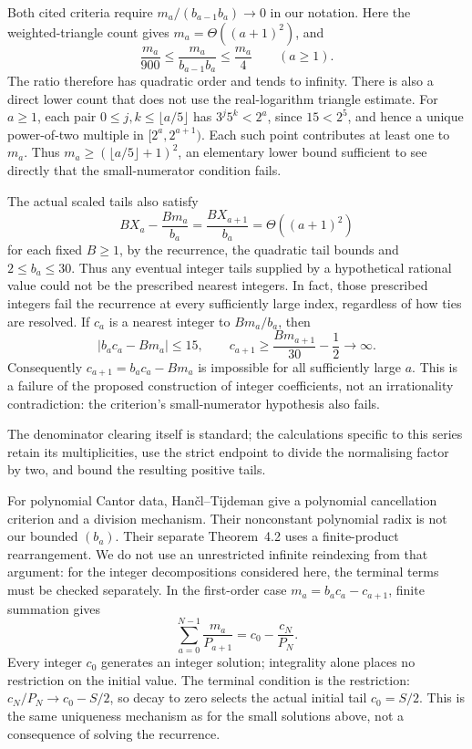 \documentclass[11pt]{article}
\theoremstyle{remark}
\theoremstyle{plain}
\begin{document}
Both cited criteria require $m_a/(b_{a-1}b_a)\to0$ in our notation.
Here the weighted-triangle count gives $m_a=\Theta((a+1)^2)$, and
\[
 \frac{m_a}{900}\le\frac{m_a}{b_{a-1}b_a}\le\frac{m_a}{4}
 \qquad(a\ge1).
\]
The ratio therefore has quadratic order and tends to infinity.
There is also a direct lower count that does not use the real-logarithm
triangle estimate.  For $a\ge1$, each pair
$0\le j,k\le\lfloor a/5\rfloor$ has $3^j5^k<2^a$, since $15<2^5$,
and hence a unique power-of-two multiple in $[2^a,2^{a+1})$.
Each such point contributes at least one to $m_a$.  Thus
$m_a\ge(\lfloor a/5\rfloor+1)^2$, an elementary lower bound sufficient
to see directly that the small-numerator condition fails.

The actual scaled tails also satisfy
\[
 BX_a-\frac{Bm_a}{b_a}=\frac{BX_{a+1}}{b_a}
 =\Theta((a+1)^2)
\]
for each fixed $B\ge1$, by the recurrence, the quadratic tail bounds and
$2\le b_a\le30$.  Thus any eventual integer tails supplied by a
hypothetical rational value could not be the prescribed nearest integers.
In fact, those prescribed integers fail the recurrence at every
sufficiently large index, regardless of how ties are resolved.  If $c_a$
is a nearest integer to $Bm_a/b_a$, then
\[
 |b_ac_a-Bm_a|\le15,\qquad
 c_{a+1}\ge\frac{Bm_{a+1}}{30}-\frac12\longrightarrow\infty.
\]
Consequently $c_{a+1}=b_ac_a-Bm_a$ is impossible for all sufficiently
large $a$.  This is a failure of the proposed construction of integer coefficients, not an irrationality
contradiction: the criterion's small-numerator hypothesis also fails.

The denominator clearing itself is standard; the calculations specific
to this series retain its multiplicities, use the strict endpoint to
divide the normalising factor by two, and bound the resulting positive tails.

For polynomial Cantor data, Han\v{c}l--Tijdeman
\cite[Theorems~2.2 and 3.1]{hancltijdeman2008} give a polynomial
cancellation criterion and a division mechanism.  Their nonconstant
polynomial radix is not our bounded $(b_a)$.  Their separate
Theorem~4.2 uses a finite-product rearrangement.  We do not use an
unrestricted infinite reindexing from that argument: for the integer
decompositions considered here, the terminal terms must be checked
separately.  In the first-order case
$m_a=b_ac_a-c_{a+1}$, finite summation gives
\[
 \sum_{a=0}^{N-1}\frac{m_a}{P_{a+1}}
 =c_0-\frac{c_N}{P_N}.
\]
Every integer $c_0$ generates an integer solution; integrality alone
places no restriction on the initial value. The terminal condition is the
restriction: $c_N/P_N\to c_0-S/2$, so decay to zero selects the actual
initial tail $c_0=S/2$. This is the same uniqueness mechanism as for the
small solutions above, not a consequence of solving the recurrence.
\end{document}
